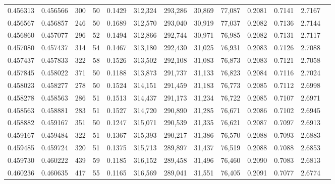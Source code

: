\begin{tabular}{rrrrrrrrrrrrr}
0.456313 & 0.456566 &   300 &  50 &                                     0.1429 & 312,324 & 293,286 &  30,869 &  77,087 & 0.2081 & 0.7141 & 2.7167 \\
0.456567 & 0.456857 &   246 &  50 &                                     0.1689 & 312,570 & 293,040 &  30,919 &  77,037 & 0.2082 & 0.7136 & 2.7144 \\
0.456860 & 0.457077 &   296 &  52 &                                     0.1494 & 312,866 & 292,744 &  30,971 &  76,985 & 0.2082 & 0.7131 & 2.7117 \\
0.457080 & 0.457437 &   314 &  54 &                                     0.1467 & 313,180 & 292,430 &  31,025 &  76,931 & 0.2083 & 0.7126 & 2.7088 \\
0.457437 & 0.457833 &   322 &  58 &                                     0.1526 & 313,502 & 292,108 &  31,083 &  76,873 & 0.2083 & 0.7121 & 2.7058 \\
0.457845 & 0.458022 &   371 &  50 &                                     0.1188 & 313,873 & 291,737 &  31,133 &  76,823 & 0.2084 & 0.7116 & 2.7024 \\
0.458023 & 0.458277 &   278 &  50 &                                     0.1524 & 314,151 & 291,459 &  31,183 &  76,773 & 0.2085 & 0.7112 & 2.6998 \\
0.458278 & 0.458563 &   286 &  51 &                                     0.1513 & 314,437 & 291,173 &  31,234 &  76,722 & 0.2085 & 0.7107 & 2.6971 \\
0.458563 & 0.458881 &   283 &  51 &                                     0.1527 & 314,720 & 290,890 &  31,285 &  76,671 & 0.2086 & 0.7102 & 2.6945 \\
0.458882 & 0.459167 &   351 &  50 &                                     0.1247 & 315,071 & 290,539 &  31,335 &  76,621 & 0.2087 & 0.7097 & 2.6913 \\
0.459167 & 0.459484 &   322 &  51 &                                     0.1367 & 315,393 & 290,217 &  31,386 &  76,570 & 0.2088 & 0.7093 & 2.6883 \\
0.459485 & 0.459724 &   320 &  51 &                                     0.1375 & 315,713 & 289,897 &  31,437 &  76,519 & 0.2088 & 0.7088 & 2.6853 \\
0.459730 & 0.460222 &   439 &  59 &                                     0.1185 & 316,152 & 289,458 &  31,496 &  76,460 & 0.2090 & 0.7083 & 2.6813 \\
0.460236 & 0.460635 &   417 &  55 &                                     0.1165 & 316,569 & 289,041 &  31,551 &  76,405 & 0.2091 & 0.7077 & 2.6774 \\

\end{tabular}
